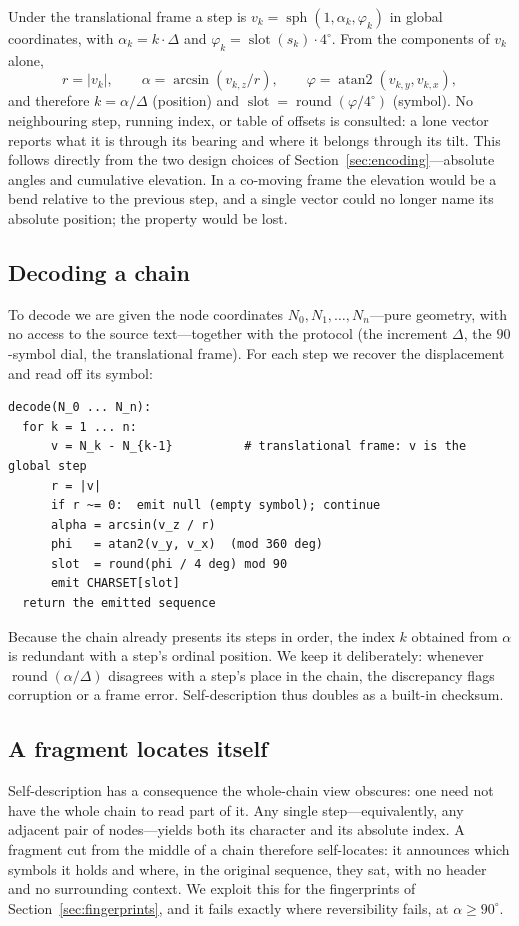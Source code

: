 \documentclass[11pt]{article}
\newcommand{\sph}{\operatorname{sph}}
\newcommand{\atantwo}{\operatorname{atan2}}
\newcommand{\slotf}{\operatorname{slot}}
\renewcommand{\deg}{^{\circ}}  %
\begin{document}
Under the translational frame a step is $v_k = \sph(1,\alpha_k,\varphi_k)$ in global
coordinates, with $\alpha_k = k\cdot\Delta$ and $\varphi_k = \slotf(s_k)\cdot 4\deg$. From the
components of $v_k$ alone,
\[
  r = |v_k|, \qquad \alpha = \arcsin(v_{k,z}/r), \qquad \varphi = \atantwo(v_{k,y},v_{k,x}),
\]
and therefore $k = \alpha/\Delta$ (position) and $\slotf = \operatorname{round}(\varphi/4\deg)$
(symbol). No neighbouring step, running index, or table of offsets is consulted: a lone
vector reports what it is through its bearing and where it belongs through its tilt. This
follows directly from the two design choices of Section~\ref{sec:encoding}---absolute angles
and cumulative elevation. In a co-moving frame the elevation would be a bend relative to the
previous step, and a single vector could no longer name its absolute position; the property
would be lost.

\subsection{Decoding a chain}

To decode we are given the node coordinates $N_0,N_1,\dots,N_n$---pure geometry, with no
access to the source text---together with the protocol (the increment $\Delta$, the
$90$-symbol dial, the translational frame). For each step we recover the displacement and
read off its symbol:
\begin{verbatim}
decode(N_0 ... N_n):
  for k = 1 ... n:
      v = N_k - N_{k-1}          # translational frame: v is the global step
      r = |v|
      if r ~= 0:  emit null (empty symbol); continue
      alpha = arcsin(v_z / r)
      phi   = atan2(v_y, v_x)  (mod 360 deg)
      slot  = round(phi / 4 deg) mod 90
      emit CHARSET[slot]
  return the emitted sequence
\end{verbatim}
Because the chain already presents its steps in order, the index $k$ obtained from $\alpha$
is redundant with a step's ordinal position. We keep it deliberately: whenever
$\operatorname{round}(\alpha/\Delta)$ disagrees with a step's place in the chain, the
discrepancy flags corruption or a frame error. Self-description thus doubles as a built-in
checksum.

\subsection{A fragment locates itself}\label{sec:fragment}

Self-description has a consequence the whole-chain view obscures: one need not have the whole
chain to read part of it. Any single step---equivalently, any adjacent pair of nodes---yields
both its character and its absolute index. A fragment cut from the middle of a chain
therefore self-locates: it announces which symbols it holds and where, in the original
sequence, they sat, with no header and no surrounding context. We exploit this for the
fingerprints of Section~\ref{sec:fingerprints}, and it fails exactly where reversibility
fails, at $\alpha\ge 90\deg$.
\end{document}
